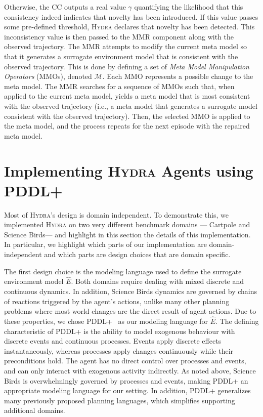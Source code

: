 \documentclass[sigconf]{aamas}
\newcommand{\sbirds}{Science Birds\xspace} %
\newcommand{\hydra}{\textsc{Hydra}\xspace} %
\begin{document}
Otherwise, the CC outputs a real value $\gamma$ quantifying the likelihood that this consistency indeed indicates that novelty has been introduced. 
If this value passes some pre-defined threshold, \hydra declares that novelty has been detected. 
This inconsistency value is then passed to the MMR component along with the observed trajectory. 
The MMR attempts to modify the current meta model so that it generates a surrogate environment model that is consistent with the observed trajectory. 
This is done by defining a set of \emph{Meta Model Manipulation Operators} (MMOs), denoted $\mathcal{M}$. 
Each MMO represents a possible change to the meta model. 
The MMR searches for a sequence of MMOs such that, when applied to the current meta model, yields a meta model that is most consistent with the observed trajectory (i.e., a meta model that generates a surrogate model consistent with the observed trajectory).  
Then, the selected MMO is applied to the meta model, and the process repeats for the next episode with the repaired meta model. 






\section{Implementing \hydra Agents using PDDL+}

Most of \hydra's design is domain independent. To demonstrate this, we implemented \hydra on two very different benchmark domains --- Cartpole and \sbirds --- and highlight in this section the details of this implementation. In particular, we highlight which parts of our implementation are domain-independent and which parts are design choices that are domain specific. 


The first design choice is the modeling language used to define the surrogate environment model $\hat{E}$. 
Both domains require dealing with mixed discrete and continuous dynamics. In addition, \sbirds dynamics are governed by chains of reactions triggered by the agent's actions, unlike many other planning problems where most world changes are the direct result of agent actions. 
Due to these properties, we chose PDDL+~\cite{fox2006modelling} as our modeling language for $\hat{E}$. 
The defining characteristic of PDDL+ is the ability to model exogenous behaviour with discrete events and continuous processes.
Events apply discrete effects instantaneously, whereas processes apply changes continuously while their preconditions hold. The agent has no direct control over processes and events, and can only interact with exogenous activity indirectly. As noted above, \sbirds is overwhelmingly governed by processes and events, making PDDL+ an appropriate modeling language for our setting.  
In addition, PDDL+ generalizes many previously proposed planning languages, which simplifies supporting additional domains. 
\end{document}
